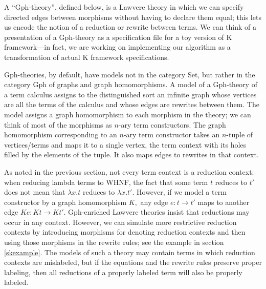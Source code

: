 \documentclass[a4paper,UKenglish]{article}
\newcommand{\maps}{\colon}
\begin{document}
A ``Gph-theory'', defined below, is a Lawvere theory in which we can specify directed edges between morphisms without having to declare them equal; this lets us encode the notion of a reduction or rewrite between terms.  We can think of a presentation of a Gph-theory as a specification file for a toy version of K framework---in fact, we are working on implementing our algorithm as a transformation of actual K framework specifications.

Gph-theories, by default, have models not in the category Set, but rather in the category Gph of graphs and graph homomorphisms.  A model of a Gph-theory of a term calculus assigns to the distinguished sort an infinite graph whose vertices are all the terms of the calculus and whose edges are rewrites between them.  The model assigns a graph homomorphism to each morphism in the theory; we can think of most of the morphisms as $n\mbox{-}$ary term constructors.  The graph homomorphism corresponding to an $n\mbox{-}$ary term constructor takes an $n\mbox{-}$tuple of vertices/terms and maps it to a single vertex, the term context with its holes filled by the elements of the tuple.  It also maps edges to rewrites in that context.

As noted in the previous section, not every term context is a reduction context: when reducing lambda terms to WHNF, the fact that some term $t$ reduces to $t'$ does not mean that $\lambda x.t$ reduces to $\lambda x.t'.$  However, if we model a term constructor by a graph homomorphism $K,$ any edge $e\maps t \to t'$ maps to another edge $Ke\maps Kt \to Kt'.$  Gph-enriched Lawvere theories insist that reductions may occur in any context.  However, we can simulate more restrictive reduction contexts by introducing morphisms for denoting reduction contexts and then using those morphisms in the rewrite rules; see the example in section \ref{skexample}.  The models of such a theory may contain terms in which reduction contexts are mislabeled, but if the equations and the rewrite rules preserve proper labeling, then all reductions of a properly labeled term will also be properly labeled.
\end{document}
